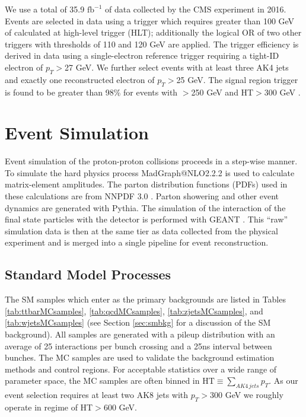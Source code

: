 We use a total of 35.9 $\mathrm{fb}^{-1}$ of data collected by the CMS experiment in 2016. Events are selected in data using a trigger which requires greater than 100 GeV of \ptmiss calculated at high-level trigger (HLT); additionally the logical OR of two other triggers with thresholds of 110 and 120 GeV are applied. The trigger efficiency is derived in data using a single-electron reference trigger requiring a tight-ID electron of $p_{T}$$>$27 GeV. We further select events with at least three AK4 jets and exactly one reconstructed electron of $p_{T}$$>$25 GeV. The signal region trigger is found to be greater than 98\% for events with \ptmiss$>$250 GeV and HT$>$300 GeV \cite{CMS-SUS-16-033}.

\section{Event Simulation}

Event simulation of the proton-proton collisions proceeds in a step-wise manner.
To simulate the hard physics process MadGraph@NLO2.2.2 \cite{Alwall:2014hca} is used to calculate matrix-element amplitudes. The parton distribution functions (PDFs) used in these calculations are from NNPDF 3.0 \cite{Ball:2014uwa}.
Parton showering and other event dynamics are generated with Pythia.
The simulation of the interaction of the final state particles with the detector is performed with GEANT \cite{Agostinelli:2002hh}.
This ``raw'' simulation data is then at the same tier as data collected from the physical experiment and is merged into a single pipeline for event reconstruction.

\subsection{Standard Model Processes}

The SM samples which enter as the primary backgrounds are listed in Tables \ref{tab:ttbarMCsamples}, \ref{tab:qcdMCsamples}, \ref{tab:zjetsMCsamples}, and \ref{tab:wjetsMCsamples} (see Section \ref{sec:smbkg} for a discussion of the SM background). All samples are generated with a pileup distribution with an average of 25 interactions per bunch crossing and a 25ns interval between bunches. The MC samples are used to validate the background estimation methods and control regions. For acceptable statistics over a wide range of parameter space, the MC samples are often binned in $\mathrm{HT}\equiv\sum_{AK4\,jets}p_{T}$. As our event selection requires at least two AK8 jets with $p_{T}$$>$300 GeV we roughly operate in regime of HT$>$600 GeV.

